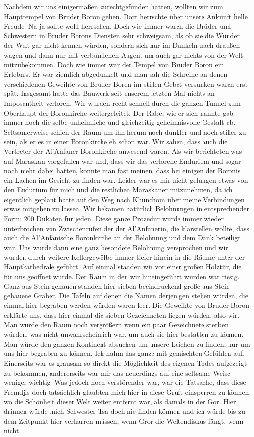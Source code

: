 Nachdem wir uns einigermaßen zurechtgefunden hatten, wollten wir zum Haupttempel von Bruder Boron gehen. Dort herrschte über unsere Ankunft helle Freude. Na ja sollte wohl herrschen. Doch wie immer waren die Brüder und Schwestern in Bruder Borons Diensten sehr schweigsam, als ob sie die Wunder der Welt gar nicht kennen würden, sondern sich nur im Dunkeln nach draußen wagen und dann nur mit verbundenen Augen, um auch gar nichts von der Welt mitzubekommen. Doch wie immer war der Tempel von Bruder Boron ein Erlebnis. Er war ziemlich abgedunkelt und man sah die Schreine an denen verschiedenen Geweihte von Bruder Boron im stillen Gebet versunken waren erst spät. Insgesamt hatte das Bauwerk seit unserem letzten Mal nichts an Imposantheit verloren. Wir wurden recht schnell durch die ganzen Tunnel zum Oberhaupt der Boronkirche weitergeleitet. Der Rabe, wie er sich nannte gab immer noch die selbe unheimliche und gleichzeitig geheimnisvolle Gestalt ab. Seltsamerweise schien der Raum um ihn herum noch dunkler und noch stiller zu sein, als er es in einer Boronkirche eh schon war. Wir sahen, dass auch die Vertreter der Al'Anfaner Boronkirche anwesend waren. Als wir berichteten was auf Maraskan vorgefallen war und, dass wir das verlorene Endurium und sogar noch mehr dabei hatten, konnte man fast meinen, dass bei einigen der Boronis ein Lachen im Gesicht zu finden war. Leider war es mir nicht gelungen etwas von den Endurium für mich und die restlichen Maraskaner mitzunehmen, da ich eigentlich geplant hatte auf den Weg nach Khunchom über meine Verbindungen etwas mitgehen zu lassen. Wir bekamen natürlich Belohnungen in entsprechender Form: 200 Dukaten für jeden. Diese ganze Prozedur wurde immer wieder unterbrochen von Zwischenrufen der der Al'Anfanerin, die klarstellen wollte, dass auch die Al'Anfanische Boronkirche an der Belohnung und dem Dank beteiligt war. Uns wurde dann eine ganz besondere Belohnung versprochen und wir wurden durch weitere Kellergewölbe immer tiefer hinein in die Räume unter der Hauptkathedrale geführt. Auf einmal standen wir vor einer großen Holztür, die für uns geöffnet wurde. Der Raum in den wir hineingeführt wurden war riesig. Ganz aus Stein gehauen standen hier sieben beeindruckend große aus Stein gehauene Gräber. Die Tafeln auf denen die Namen derjenigen stehen würden, die einmal hier begraben werden würden waren leer. Die Geweihte von Bruder Boron erklärte uns, dass hier einmal die sieben Gezeichneten liegen würden, also wir. Man würde den Raum noch vergrößern wenn ein paar Gezeichnete sterben würden, was nicht unwahrscheinlich war, um auch sie hier bestatten zu können. Man würde den ganzen Kontinent absuchen um unsere Leichen zu finden, nur um uns hier begraben zu können. Ich nahm das ganze mit gemischten Gefühlen auf. Einerseits war es grausam so direkt die Möglichkeit des eigenen Todes aufgezeigt zu bekommen, andererseits war mir das neuerdings auf eine seltsame Weise weniger wichtig. Was jedoch noch verstörender war, war die Tatsache, dass diese Fremdjis doch tatsächlich glaubten mich hier in diese Gruft einsperren zu können wo die Schönheit dieser Welt weiter entfernt war, als damals in der Gor. Hier drinnen würde mich Schwester Tsa doch nie finden können und ich würde bis zu dem Zeitpunkt hier verharren müssen, wenn Gror die Weltendiskus fängt, wenn nicht 